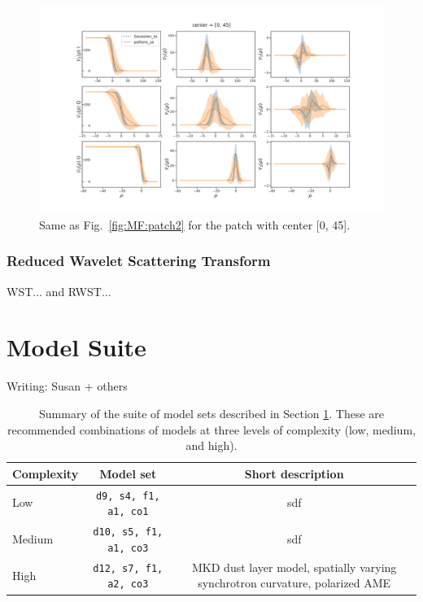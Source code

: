 \documentclass[twocolumn]{aastex631}
\begin{document}
\begin{figure}[hbt]
    \centering
    \includegraphics[width=180mm]{center_0_45.pdf}
    \caption{Same as Fig.~\ref{fig:MF:patch2} for the patch with center [0, 45].}
    \label{fig:MF:patch1}
\end{figure}

\subsubsection{Reduced Wavelet Scattering Transform}
WST... and RWST...


\section{Model Suite}\label{sec:modelsuite}
Writing: Susan + others

\begin{table}[]
    \centering
    \begin{tabular}{lcc}
    
    \toprule 
    Complexity & Model set & Short description \\
    \midrule
    Low  & \texttt{d9, s4, f1, a1, co1} & sdf  \\
    Medium  & \texttt{d10, s5, f1, a1, co3} & sdf   \\
    High  & \texttt{d12, s7, f1, a2, co3} & MKD dust layer model, spatially varying synchrotron curvature, polarized AME  \\
   
   \bottomrule
    \end{tabular}
    \caption{Summary of the suite of model sets described in Section \ref{sec:modelsuite}. These are recommended combinations of models at three levels of complexity (low, medium, and high).  }
    \label{tab:modelsuite}
\end{table}
\end{document}
